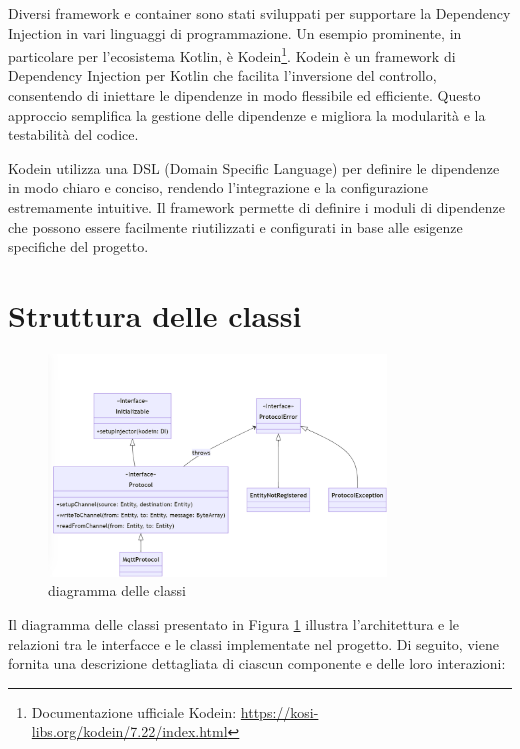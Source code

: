 \documentclass[12pt,a4paper,openright,twoside]{book}
\begin{document}
Diversi framework e container sono stati sviluppati per supportare la Dependency Injection in vari linguaggi di programmazione. 
Un esempio prominente, in particolare per l'ecosistema Kotlin, è Kodein\footnote{
    Documentazione ufficiale Kodein: \url{https://kosi-libs.org/kodein/7.22/index.html} 
}. 
Kodein è un framework di Dependency Injection per Kotlin che facilita 
l'inversione del controllo, consentendo di iniettare le dipendenze in modo flessibile ed efficiente. Questo approccio semplifica la gestione delle dipendenze 
e migliora la modularità e la testabilità del codice.

Kodein utilizza una DSL (Domain Specific Language) per definire le dipendenze in modo chiaro e conciso, rendendo l'integrazione e la configurazione estremamente intuitive. 
Il framework permette di definire i moduli di dipendenze che possono essere facilmente riutilizzati e configurati in base alle esigenze specifiche del progetto.

\section{Struttura delle classi}

\begin{figure}[H]
    \centering
    \includegraphics[width=0.8\textwidth]{figures/class-diagram.png}
    \caption{diagramma delle classi}
    \label{fig:class-diagram}
\end{figure}

Il diagramma delle classi presentato in Figura \ref{fig:class-diagram} illustra l'architettura e le relazioni tra le interfacce e le classi implementate nel progetto. 
Di seguito, viene fornita una descrizione dettagliata di ciascun componente e delle loro interazioni:
\end{document}
